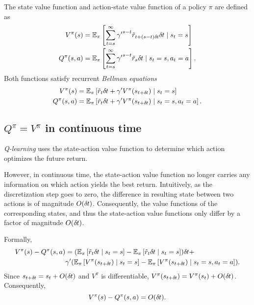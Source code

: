 The state value function and action-state value function of a policy
$\pi$ are defined as
\begin{align}
	V^\pi(s) &= \mathbb{E}_\pi\left[
		\sum\limits_{t=s}^\infty
		{\gamma'}^{s - t} \tilde{r}_{t + (s-t)\delta\hspace{-.06em}t} \delta\hspace{-.06em}t
		\mid
		s_t = s
	\right]\\
	Q^\pi(s, a) &= \mathbb{E}_\pi\left[
		\sum\limits_{t=s}^\infty
		{\gamma'}^{s - t} \tilde{r}_s \delta\hspace{-.06em}t
		\mid
		s_t = s, a_t = a
	\right].
\end{align}
Both functions satisfy recurrent \emph{Bellman equations}
\begin{align}
	V^\pi(s) &= \mathbb{E}_\pi\left[
		\tilde{r}_t \delta\hspace{-.06em}t + \gamma' V^\pi(s_{t + \delta\hspace{-.06em}t})
		\mid
	s_t = s\right]\\
	Q^\pi(s, a) &= \mathbb{E}_\pi\left[
		\tilde{r}_t \delta\hspace{-.06em}t + \gamma' V^\pi(s_{t + \delta\hspace{-.06em}t})
		\mid
	s_t = s, a_t = a\right].
\end{align}

\subsection{$Q^\pi = V^\pi$ in continuous time}
\emph{Q-learning} uses the state-action value function to determine which
action optimizes the future return.

However, in continuous time, the state-action value function no longer carries
any information on which action yields the best return. Intuitively, as the
discretization step goes to zero, the difference in resulting state between two
actions is of magnitude $O (\delta\hspace{-.06em}t)$. Consequently, the value functions of
the corresponding states, and thus the state-action value functions only differ
by a factor of magnitude $O (\delta\hspace{-.06em}t)$.

Formally,
\begin{align}
	V^\pi(s) - Q^\pi(s, a) &= 
	(\mathbb{E}_\pi\left[\tilde{r}_t \delta\hspace{-.06em}t \mid s_t=s\right] -
	\mathbb{E}_\pi\left[\tilde{r}_t \delta\hspace{-.06em}t \mid s_t=s\right]) \delta\hspace{-.06em}t +\\
	&\gamma'(\mathbb{E}_\pi\left[
		V^\pi(s_{t + \delta\hspace{-.06em}t})
		\mid s_t = s
	\right] - \mathbb{E}_\pi\left[
		V^\pi(s_{t + \delta\hspace{-.06em}t})
		\mid s_t = s, a_t=a
	\right]).\nonumber
\end{align}
Since $s_{t+\delta\hspace{-.06em}t} = s_t + O (\delta\hspace{-.06em}t)$ and $V^\pi$ is differentiable,
$V^\pi(s_{t+\delta\hspace{-.06em}t}) = V^\pi(s_t) + O (\delta\hspace{-.06em}t)$. Consequently,
\begin{equation}
	V^\pi(s) - Q^\pi(s, a) = O (\delta\hspace{-.06em}t).
\end{equation}

